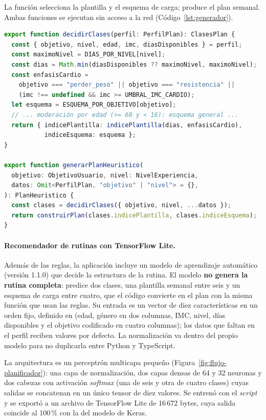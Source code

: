 La función  selecciona la plantilla y el esquema de
carga;  produce el plan semanal. Ambas funciones se
ejecutan sin acceso a la red (Código~\ref{lst:generador}).

\begin{lstlisting}[language=TypeScript, caption={Punto de entrada del generador basado en reglas}, label={lst:generador}]
export function decidirClases(perfil: PerfilPlan): ClasesPlan {
  const { objetivo, nivel, edad, imc, diasDisponibles } = perfil;
  const maximoNivel = DIAS_POR_NIVEL[nivel];
  const dias = Math.min(diasDisponibles ?? maximoNivel, maximoNivel);
  const enfasisCardio =
    objetivo === "perder_peso" || objetivo === "resistencia" ||
    (imc !== undefined && imc >= UMBRAL_IMC_CARDIO);
  let esquema = ESQUEMA_POR_OBJETIVO[objetivo];
  // ... moderación por edad (>= 60 y < 16): esquema general ...
  return { indicePlantilla: indicePlantilla(dias, enfasisCardio),
           indiceEsquema: esquema };
}

export function generarPlanHeuristico(
  objetivo: ObjetivoUsuario, nivel: NivelExperiencia,
  datos: Omit<PerfilPlan, "objetivo" | "nivel"> = {},
): PlanHeuristico {
  const clases = decidirClases({ objetivo, nivel, ...datos });
  return construirPlan(clases.indicePlantilla, clases.indiceEsquema);
}
\end{lstlisting}

\paragraph{Recomendador de rutinas con TensorFlow Lite.} Además de las reglas, la
aplicación incluye un modelo de aprendizaje automático (versión 1.1.0) que
decide la estructura de la rutina. El modelo \textbf{no genera la rutina
completa}: predice dos clases, una plantilla semanal entre seis y un esquema de
carga entre cuatro, que el código convierte en el plan con la misma función
 que usan las reglas. Su entrada es un vector de diez
características en un orden fijo, definido en 
(edad, género en dos columnas, IMC, nivel, días disponibles y el objetivo
codificado en cuatro columnas); los datos que faltan en el perfil reciben
valores por defecto. La normalización va dentro del propio modelo para no
duplicarla entre Python y TypeScript.

La arquitectura es un perceptrón multicapa pequeño (Figura~\ref{fig:flujo-planificador}):
una capa de normalización, dos capas densas de 64 y 32 neuronas y dos cabezas
con activación \emph{softmax} (una de seis y otra de cuatro clases) cuyas
salidas se concatenan en un único tensor de diez valores. Se entrenó con el
\emph{script}  y se exportó a un archivo
de TensorFlow Lite de 16\,672 bytes, cuya salida coincide al 100\,\% con la del
modelo de Keras.

